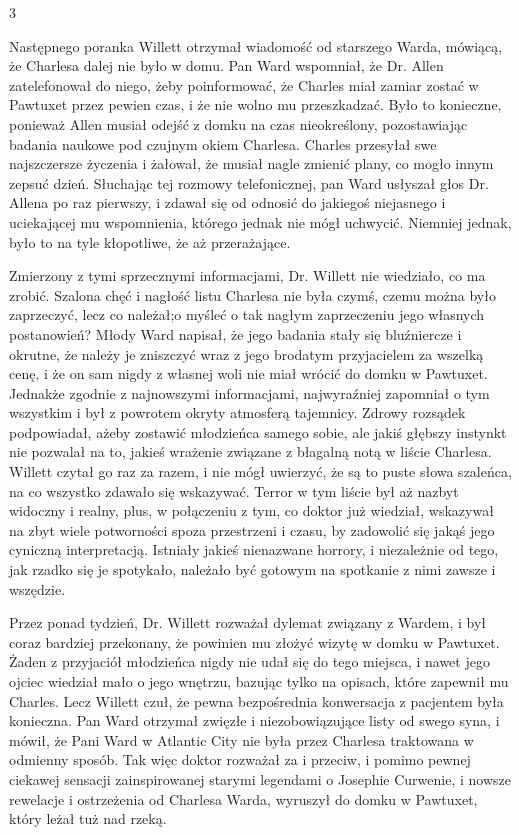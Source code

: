 \begin{center}
3
\end{center}

Następnego poranka Willett otrzymał wiadomość od starszego Warda, mówiącą, że Charlesa dalej nie było w domu. Pan Ward wspomniał, że Dr. Allen zatelefonował do niego, żeby poinformować, że Charles miał zamiar zostać w Pawtuxet przez pewien czas, i że nie wolno mu przeszkadzać. Było to konieczne, ponieważ Allen musiał odejść z domku na czas nieokreślony, pozostawiając badania naukowe pod czujnym okiem Charlesa. Charles przesyłał swe najszczersze życzenia i żałował, że musiał nagle zmienić plany, co mogło innym zepsuć dzień. Słuchając tej rozmowy telefonicznej, pan Ward usłyszał głos Dr. Allena po raz pierwszy, i zdawał się od odnosić do jakiegoś niejasnego i uciekającej mu wspomnienia, którego jednak nie mógł uchwycić. Niemniej jednak, było to na tyle kłopotliwe, że aż przerażające. 

Zmierzony z tymi sprzecznymi informacjami, Dr. Willett nie wiedziało, co ma zrobić. Szalona chęć i nagłość listu Charlesa nie była czymś, czemu można było zaprzeczyć, lecz co należał;o myśleć o tak nagłym zaprzeczeniu jego własnych postanowień? Młody Ward napisał, że jego badania stały się bluźniercze i okrutne, że należy je zniszczyć wraz z jego brodatym przyjacielem za wszelką cenę, i że on sam nigdy z własnej woli nie miał wrócić do domku w Pawtuxet. Jednakże zgodnie z najnowszymi informacjami, najwyraźniej zapomniał o tym wszystkim i był z powrotem okryty atmosferą tajemnicy. Zdrowy rozsądek podpowiadał, ażeby zostawić młodzieńca samego sobie, ale jakiś głębszy instynkt nie pozwalał na to, jakieś wrażenie związane z błagalną notą w liście Charlesa. Willett czytał go raz za razem, i nie mógł uwierzyć, że są to puste słowa szaleńca, na co wszystko zdawało się wskazywać. Terror w tym liście był aż nazbyt widoczny i realny, plus, w połączeniu z tym, co doktor już wiedział, wskazywał na zbyt wiele potworności spoza przestrzeni i czasu, by zadowolić się jakąś jego cyniczną interpretacją. Istniały jakieś nienazwane horrory, i niezależnie od tego, jak rzadko się je spotykało, należało być gotowym na spotkanie z nimi zawsze i wszędzie. 

Przez ponad tydzień, Dr. Willett rozważał dylemat związany z Wardem, i był coraz bardziej przekonany, że powinien mu złożyć wizytę w domku w Pawtuxet. Żaden z przyjaciół młodzieńca nigdy nie udał się do tego miejsca, i nawet jego ojciec wiedział mało o jego wnętrzu, bazując tylko na opisach, które zapewnił mu Charles. Lecz Willett czuł, że pewna bezpośrednia konwersacja z pacjentem była konieczna. Pan Ward otrzymał zwięzłe i niezobowiązujące listy od swego syna, i mówił, że Pani Ward w Atlantic City nie była przez Charlesa traktowana w odmienny sposób. Tak więc doktor rozważał za i przeciw, i pomimo pewnej ciekawej sensacji zainspirowanej starymi legendami o Josephie Curwenie, i nowsze rewelacje i ostrzeżenia od Charlesa Warda, wyruszył do domku w Pawtuxet, który leżał tuż nad rzeką. 

